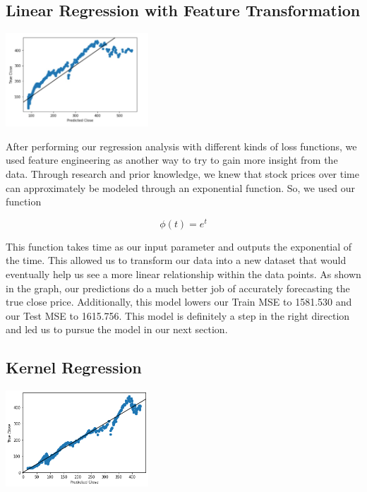 \documentclass[final,5p,times,twocolumn,authoryear, 12pt]{elsarticle}
\begin{document}
\subsection{Linear Regression with Feature Transformation}

\includegraphics[width=0.4\textwidth, angle=0]{linregFT.jpeg}

After performing our regression analysis with different kinds of loss functions, we used feature engineering as another way to try to gain more insight from the data. Through research and prior knowledge, we knew that stock prices over time can approximately be modeled through an exponential function. So, we used our function

\begin{adjustwidth}{2.8cm}{}
    \[
        \phi(t) = e^t
    \]
\end{adjustwidth}

This function takes time as our input parameter and outputs the exponential of the time. This allowed us to transform our data into a new dataset that would eventually help us see a more linear relationship within the data points. As shown in the graph, our predictions do a much better job of accurately forecasting the true close price. Additionally, this model lowers our Train MSE to 1581.530 and our Test MSE to 1615.756. This model is definitely a step in the right direction and led us to pursue the model in our next section.

\subsection{Kernel Regression}

\includegraphics[width=0.4\textwidth, angle=0]{linregRBF.png}
\end{document}
